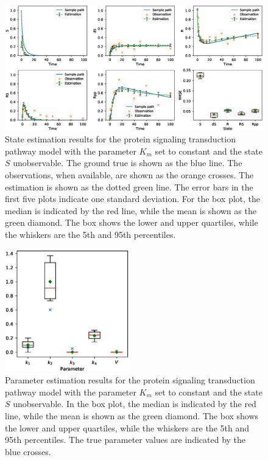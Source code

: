 \begin{figure}
    \centering
    \includegraphics[width=\textwidth]{graphics/protein-states-without-km-partial}
    \caption{State estimation results for the protein signaling transduction pathway model with the parameter $K_m$ set to constant and the state $S$ unobservable. The ground true is shown as the blue line. The observations, when available, are shown as the orange crosses. The estimation is shown as the dotted green line. The error bars in the first five plots indicate one standard deviation. For the box plot, the median is indicated by the red line, while the mean is shown as the green diamond. The box shows the lower and upper quartiles, while the whiskers are the 5th and 95th percentiles.}
    \label{fig-protein-states-partial-without-km}
\end{figure}

\begin{figure}
    \centering
    \includegraphics[width=0.48\textwidth]{graphics/protein-parameters-without-km-partial}
    \caption{Parameter estimation results for the protein signaling transduction pathway model with the parameter $K_m$ set to constant and the state $S$ unobservable. In the box plot, the median is indicated by the red line, while the mean is shown as the green diamond. The box shows the lower and upper quartiles, while the whiskers are the 5th and 95th percentiles. The true parameter values are indicated by the blue crosses.}
    \label{fig-protein-parameters-partial-without-km}
\end{figure}

